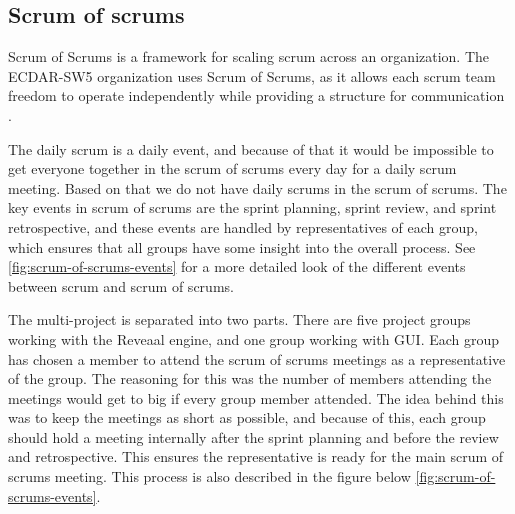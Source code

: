 \subsection{Scrum of scrums}\label{sub:scrum-of-scrums}
Scrum of Scrums is a framework for scaling scrum across an organization. 
The ECDAR-SW5 organization uses Scrum of Scrums, as it allows each scrum team freedom to operate independently while providing a structure for communication \cite{spanner_scrum_nodate}. 

The daily scrum is a daily event, and because of that it would be impossible to get everyone together in the scrum of scrums every day for a daily scrum meeting.
Based on that we do not have daily scrums in the scrum of scrums.
The key events in scrum of scrums are the sprint planning, sprint review, and sprint retrospective, and these events are handled by representatives of each group, which ensures that all groups have some insight into the overall process.
See \autoref{fig:scrum-of-scrums-events} for a more detailed look of the different events between scrum and scrum of scrums.

The multi-project is separated into two parts. 
There are five project groups working with the Reveaal engine, and one group working with GUI.
Each group has chosen a member to attend the scrum of scrums meetings as a representative of the group.
The reasoning for this was the number of members attending the meetings would get to big if every group member attended. 
The idea behind this was to keep the meetings as short as possible, and because of this, each group should hold a meeting internally after the sprint planning and before the review and retrospective. This ensures the representative is ready for the main scrum of scrums meeting. This process is also described in the figure below \ref{fig:scrum-of-scrums-events}.



